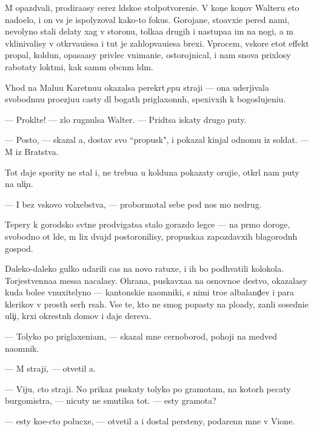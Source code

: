 \documentclass[10pt]{book}
\begin{document}
M{\yi} opazd{\yi}vali, prodira{\y}asy cerez l{\io}dsko{\y}e stolpotvoreni{\y}e. V kon{\c}e kon{\c}ov Walteru eto nado{\y}elo, i on vs{\e} je ispolyzoval kako{\y}-to fokus. Gorojane, sto{\y}avxi{\y}e pered nami, nevolyno stali delaty xag v storonu, tolka{\y}a drugih i nastupa{\y}a im na nogi, a m{\yi} vklinivalisy v otkr{\yi}va{\y}u{\x}i{\y}esa i tut je zahlop{\yi}va{\y}u{\x}i{\y}esa brexi. Vprocem, vskore etot effekt propal, koldun, opasa{\y}asy privlec vnimani{\y}e, ostorojnical, i nam snova pri\-xlosy rabotaty lokt{\ia}mi, kak sam{\yi}m ob{\yi}cn{\yi}m l{\io}d{\ia}m.

V{\yi}hod na Malu{\y}u Karetnu{\y}u okazalsa perekr{\yi}t {\c}ep{\y}u straji — ona uderjivala svobodnu{\y}u pro{\y}ezju{\y}u casty dl{\ia} bogat{\yi}h priglaxonn{\yi}h, spexivxih k bogoslujeni{\y}u.

— Prokl{\ia}t{\y}e! — zlo rugnulsa Walter. — Prid{\e}tsa iskaty drugo{\y} puty.

— Posto{\y}, — skazal {\y}a, dostav svo{\y} ``propusk", i pokazal kinjal odnomu iz soldat. — M{\yi} iz Bratstva.

Tot daje spority ne stal i, ne trebu{\y}a u kolduna pokazaty oruji{\y}e, otkr{\yi}l nam puty na uli{\c}u.

— I bez vs{\ia}kovo volxebstva, — probormotal sebe pod nos mo{\y} nedrug.

Tepery k gorodsko{\y} sv{\ia}t{\yi}ne prodvigatsa stalo gorazdo legce — na pr{\ia}mo{\y} do\-ro\-ge, svobodno{\y} ot l{\io}de{\y}, m{\yi} lix dvajd{\yi} postoronilisy, propuska{\y}a zapozdavxih blago\-rod\-n{\yi}h gospod.

Daleko-daleko gulko udarili cas{\yi} na novo{\y} ratuxe, i ih bo{\y} podhvatili kolokola. Torjestvenna{\y}a messa nacalasy. Ohrana, puskavxa{\y}a na osnovno{\y}e de{\y}stvo, okazalasy kuda bole{\y}e vnuxitelyno{\y} — kantonski{\y}e na{\y}omniki, s nimi tro{\y}e albaland{\c}ev i para klerikov v prost{\yi}h ser{\yi}h r{\ia}sah. Vse te, kto ne smog popasty na plo{\x}ady, zan{\ia}li sosedni{\y}e uli{\c}i, kr{\yi}xi okrestn{\yi}h domov i daje derev{\y}a.

— Tolyko po priglaxeni{\y}am, — skazal mne cernoborod{\yi}{\y}, pohoji{\y} na medved{\ia} na{\y}omnik.

— M{\yi} straji, — otvetil {\y}a.

— Viju, cto straji. No prikaz puskaty tolyko po gramotam, na kotor{\yi}h pecaty burgomistra, — nicuty ne smutilsa tot. — {\Y}esty gramota?

— {\Y}esty ko{\y}e-cto polucxe, — otvetil {\y}a i dostal persteny, podarenn{\yi}{\y} mne v Vione.
\end{document}
